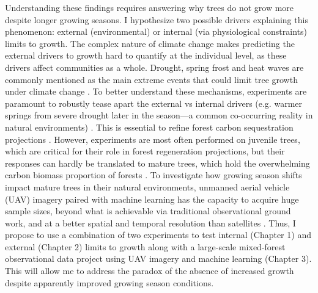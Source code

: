 \documentclass[12pt]{article}
\begin{document}
Understanding these findings requires answering why trees do not grow more despite longer growing seasons. I hypothesize two possible drivers explaining this phenomenon: external (environmental) \cite{kolar_response_2016} or internal (via physiological constraints)\cite{zohner_effect_2023} limits to growth. The complex nature of climate change makes predicting the external drivers to growth hard to quantify at the individual level, as these drivers affect communities as a whole. Drought, spring frost and heat waves are commonly mentioned as the main extreme events that could limit tree growth under climate change \cite{tyree_xylem_2002, choat_triggers_2018, li_widespread_2023,trenberth_global_2014,intergovernmental_panel_on_climate_change_detection_2014,chiang_evidence_2021,polgar_leafout_2011,reinmann_compensatory_2023}. To better understand these mechanisms, experiments are paramount to robustly tease apart the external vs internal drivers (e.g. warmer springs from severe drought later in the season---a common co-occurring reality in natural environments) \cite{morin_changes_2010,primack_observations_2015}. This is essential to refine forest carbon sequestration projections \cite{green_limits_2022,cabon_cross-biome_2022}. However, experiments are most often performed on juvenile trees, which are critical for their role in forest regeneration projections, but their responses can hardly be translated to mature trees, which hold the overwhelming carbon biomass proportion of forests \cite{augspurger_differences_2003,silvestro_longer_2023,vitasse_ontogenic_2013}. To investigate how growing season shifts impact mature trees in their natural environments, unmanned aerial vehicle (UAV) imagery paired with machine learning has the capacity to acquire huge sample sizes, beyond what is achievable via traditional observational ground work, and at a better spatial and temporal resolution than satellites \cite{berra_assessing_2019,piao_plant_2019,teng_bringing_2025}. Thus, I propose to use a combination of two experiments to test internal (Chapter 1) and external (Chapter 2) limits to growth along with a large-scale mixed-forest observational data project using UAV imagery and machine learning (Chapter 3). This will allow me to address the paradox of the absence of increased growth despite apparently improved growing season conditions. 
\end{document}
